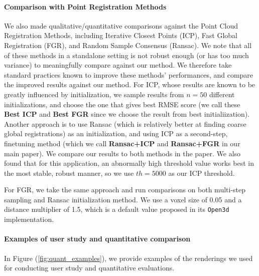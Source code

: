 \paragraph{Comparison with Point Registration Methods} We also made qualitative/quantitative comparisons against the Point Cloud Registration Methods, including Iterative Closest Points (ICP), Fast Global Registration (FGR), and Random Sample Consensus (Ransac). We note that all of these methods in a standalone setting is not robust enough (or has too much variance) to meaningfully compare against our method. We therefore take standard practices known to improve these methods' performances, and compare the improved results against our method. For ICP, whose results are known to be greatly influenced by initialization, we sample results from $n=50$ different initializations, and choose the one that gives best RMSE score (we call these \textbf{Best ICP} and \textbf{Best FGR} since we choose the result from best initialiization). Another approach is to use Ransac (which is relatively better at finding coarse global registrations) as an initialization, and using ICP as a second-step, finetuning method (which we call \textbf{Ransac+ICP} and \textbf{Ransac+FGR} in our main paper). We compare our results to both methods in the paper. We also found that for this application, an abnormally high threshold value works best in the most stable, robust manner, so we use $th=5000$ as our ICP threshold. 

For FGR, we take the same approach and run comparisons on both multi-step sampling and Ransac initialization method. We use a voxel size of 0.05 and a distance multiplier of 1.5, which is a default value proposed in its \texttt{Open3d} implementation.

\paragraph{Examples of user study and quantitative comparison}
In Figure (\ref{fig:quant_examples}), we provide examples of the renderings we used for conducting user study and quantitative evaluations. 
